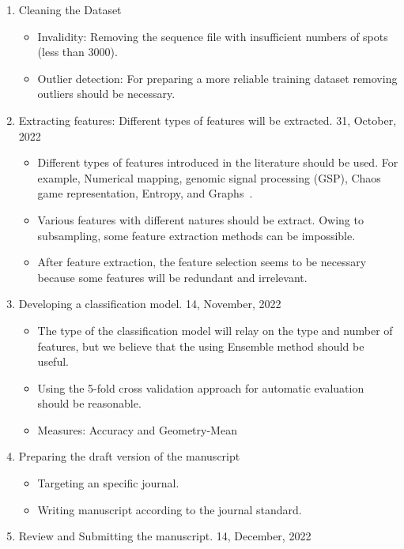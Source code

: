 \documentclass[a4paper]{article}
\newcommand{\deadline}[1]{{\color{blue} \hfill{#1} }}
\begin{document}
\begin{enumerate}
        \item Cleaning the Dataset
        \begin{itemize}
            \item Invalidity: Removing the sequence file with insufficient numbers of spots (less than 3000).
            \item Outlier detection: For preparing a more reliable training dataset removing outliers should be necessary.
        \end{itemize}
        \item Extracting features: Different types of features will be extracted. \deadline{31, October, 2022}
        \begin{itemize}
            \item Different types of features introduced in the literature should be used.
            For example, Numerical mapping, genomic signal processing (GSP), Chaos game representation, Entropy, and Graphs~\cite{RF101}.
            \item Various features with different natures should be extract.
            Owing to subsampling, some feature extraction methods can be impossible.
            \item After feature extraction, the feature selection seems to be necessary because some features will be redundant and irrelevant.
        \end{itemize}
        \item Developing a classification model.  \deadline{14, November, 2022}
        \begin{itemize}
            \item The type of the classification model will relay on the type and number of features, but we believe that the using Ensemble method should be useful.
            \item Using the 5-fold cross validation approach for automatic evaluation should be reasonable.
            \item Measures: Accuracy and Geometry-Mean
        \end{itemize}
        \item Preparing the draft version of the manuscript
        \begin{itemize}
            \item Targeting an specific journal.
            \item Writing manuscript according to the journal standard.
        \end{itemize}
        \item Review and Submitting the manuscript.\deadline{14, December, 2022}

\end{enumerate}
\end{document}
